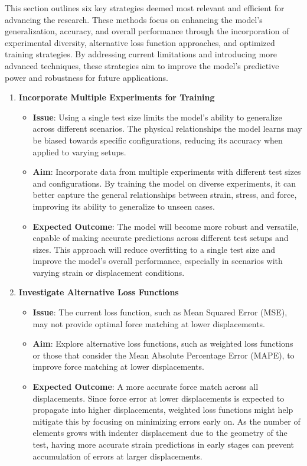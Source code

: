 This section outlines six key strategies deemed most relevant and efficient for advancing the research. These methods focus on enhancing the model’s generalization, accuracy, and overall performance through the incorporation of experimental diversity, alternative loss function approaches, and optimized training strategies. By addressing current limitations and introducing more advanced techniques, these strategies aim to improve the model's predictive power and robustness for future applications.

\begin{enumerate}

    \item \textbf{Incorporate Multiple Experiments for Training}
    \begin{itemize}
        \item \textbf{Issue}: Using a single test size limits the model's ability to generalize across different scenarios. The physical relationships the model learns may be biased towards specific configurations, reducing its accuracy when applied to varying setups.
        \item \textbf{Aim}: Incorporate data from multiple experiments with different test sizes and configurations. By training the model on diverse experiments, it can better capture the general relationships between strain, stress, and force, improving its ability to generalize to unseen cases.
        \item \textbf{Expected Outcome}: The model will become more robust and versatile, capable of making accurate predictions across different test setups and sizes. This approach will reduce overfitting to a single test size and improve the model's overall performance, especially in scenarios with varying strain or displacement conditions.
    \end{itemize}
    
    \item \textbf{Investigate Alternative Loss Functions}
    \begin{itemize}
        \item \textbf{Issue}: The current loss function, such as Mean Squared Error (MSE), may not provide optimal force matching at lower displacements.
        \item \textbf{Aim}: Explore alternative loss functions, such as weighted loss functions or those that consider the Mean Absolute Percentage Error (MAPE), to improve force matching at lower displacements.
        \item \textbf{Expected Outcome}: A more accurate force match across all displacements. Since force error at lower displacements is expected to propagate into higher displacements, weighted loss functions might help mitigate this by focusing on minimizing errors early on. As the number of elements grows with indenter displacement due to the geometry of the test, having more accurate strain predictions in early stages can prevent accumulation of errors at larger displacements.
    \end{itemize}
    


\end{enumerate}
